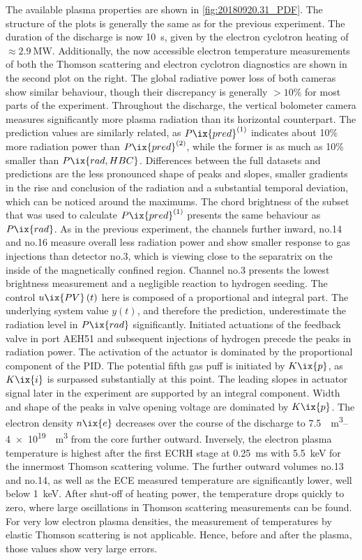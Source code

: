 %
            The available plasma properties are shown in \cref{fig:20180920.31_PDF}. The structure of the plots is generally the same as for the previous experiment. The duration of the discharge is now \SI{10}{\second}, given by the electron cyclotron heating of $\approx\SI{2.9}{\mega\watt}$. Additionally, the now accessible electron temperature measurements of both the Thomson scattering and electron cyclotron diagnostics are shown in the second plot on the right. The global radiative power loss of both cameras show similar behaviour, though their discrepancy is generally $>10\%$ for most parts of the experiment. Throughout the discharge, the vertical bolometer camera measures significantly more plasma radiation than its horizontal counterpart. The prediction values are similarly related, as $P\ix{pred}^{\left(1\right)}$ indicates about 10\% more radiation power than $P\ix{pred}^{\left(2\right)}$, while the former is as much as 10\% smaller than $P\ix{rad, HBC}$. Differences between the full datasets and predictions are the less pronounced shape of peaks and slopes, smaller gradients in the rise and conclusion of the radiation and a substantial temporal deviation, which can be noticed around the maximums. The chord brightness of the subset that was used to calculate $P\ix{pred}^{\left(1\right)}$ presents the same behaviour as $P\ix{rad}$. As in the previous experiment, the channels further inward, no.14 and no.16 measure overall less radiation power and show smaller response to gas injections than detector no.3, which is viewing close to the separatrix on the inside of the magnetically confined region. Channel no.3 presents the lowest brightness measurement and a negligible reaction to hydrogen seeding. The control $u\ix{PV}\left(t\right)$ here is composed of a proportional and integral part. The underlying system value $y\left(t\right)$, and therefore the prediction, underestimate the radiation level in $P\ix{rad}$ significantly. Initiated actuations of the feedback valve in port AEH51 and subsequent injections of hydrogen precede the peaks in radiation power. The activation of the actuator is dominated by the proportional component of the PID. The potential fifth gas puff is initiated by $K\ix{p}$, as $K\ix{i}$ is surpassed substantially at this point. The leading slopes in actuator signal later in the experiment are supported by an integral component. Width and shape of the peaks in valve opening voltage are dominated by $K\ix{p}$. The electron density $n\ix{e}$ decreases over the course of the discharge to \SIrange[per-mode=reciprocal]{7.5}{4e19}{\per\cubic\meter} from the core further outward. Inversely, the electron plasma temperature is highest after the first ECRH stage at \SI{0.25}{\milli\second} with \SI{5.5}{\kilo\electronvolt} for the innermost Thomson scattering volume. The further outward volumes no.13 and no.14, as well as the ECE measured temperature are significantly lower, well below \SI{1}{\kilo\electronvolt}. After shut-off of heating power, the temperature drops quickly to zero, where large oscillations in Thomson scattering measurements can be found. For very low electron plasma densities, the measurement of temperatures by elastic Thomson scattering is not applicable. Hence, before and after the plasma, those values show very large errors.\\%
